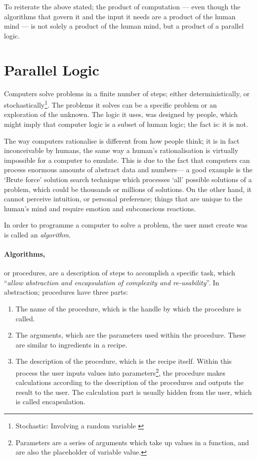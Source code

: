 To reiterate the above stated; the product of computation --- even though the algorithms that govern it and the input it needs are a product of the human mind --- is not solely a product of the human mind, but a product of a parallel logic.

\section{Parallel Logic}

\label{ParallelLogic}
Computers solve problems in a finite number of steps; either deterministically, or stochastically\footnote{Stochastic: Involving a random variable \cite{merriam03}}. The problems it solves can be a specific problem or an exploration of the unknown. The logic it uses, was designed by people, which might imply that computer logic is a subset of human logic; the fact is: it is not.

The way computers rationalise is different from how people think; it is in fact inconceivable by humans, the same way a human's rationalisation is virtually impossible for a computer to emulate.  This is due to the fact that computers can process enormous amounts of abstract data and numbers--- a good example is the `Brute force' solution search technique which processes `all' possible solutions of a problem, which could be thousands or millions of solutions. On the other hand, it cannot perceive intuition, or personal preference; things that are unique to the human's mind and require emotion and subconscious reactions.

In order to programme a computer to solve a problem, the user must create was is called an \emph{algorithm}.

\paragraph{Algorithms,}or procedures, are a description of steps to accomplish a specific task, which ``\emph{allow abstraction and encapsulation of complexity and re-usability}''\cite{hernandez06}. In abstraction; procedures have three parts:
\begin{enumerate}
  \item The name of the procedure, which is the handle by which the procedure is called.
  \item The arguments, which are the parameters used within the procedure. These are similar to ingredients in a recipe.
  \item The description of the procedure, which is the recipe itself. Within this process the user inputs values into parameters\footnote{Parameters are a series of arguments which take up values in a function, and are also the placeholder of variable value.}, the procedure makes calculations according to the description of the procedures and outputs the result to the user. The calculation part is usually hidden from the user, which is called encapsulation.
\end{enumerate}

